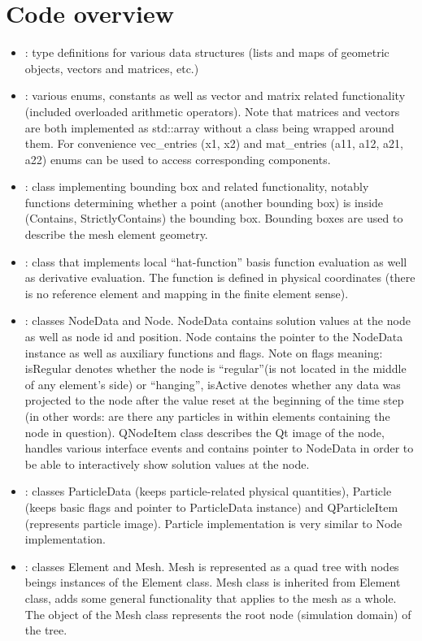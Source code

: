 \section{Code overview}
\begin{itemize}
  \item {} : type definitions for various data structures (lists and maps of geometric objects, vectors and matrices, etc.)
  \item {} : various enums, constants as well as vector and matrix related functionality (included overloaded arithmetic operators).
	Note that matrices and vectors are both implemented as std::array without a class being wrapped around them. For convenience vec\_entries (x1, x2) and 
	mat\_entries (a11, a12, a21, a22) enums can be used to access corresponding components.
  \item {} : class implementing bounding box and related functionality, notably functions determining whether a point (another bounding box)
	is inside (Contains, StrictlyContains) the bounding box. Bounding boxes are used to describe the mesh element geometry.
  \item {} : class that implements local ``hat-function'' basis function evaluation as well as derivative evaluation. The function is defined in
	physical coordinates (there is no reference element and mapping in the finite element sense).
  \item {} : classes NodeData and Node. NodeData contains solution values at the node as well as node id and position. Node contains
	the pointer to the NodeData instance as well as auxiliary functions and flags. Note on flags meaning: isRegular denotes whether the node is 
	``regular''(is not located in the middle of any element's side) or ``hanging'', isActive denotes whether any data was projected to the node after the 
	value reset at the beginning of the time step (in other words: are there any particles in within elements containing the node in question).
	QNodeItem class describes the Qt image of the node, handles various interface events and contains pointer to NodeData in order to be able to interactively
	show solution values at the node.
  \item {} : classes ParticleData (keeps particle-related physical quantities), Particle (keeps basic flags and pointer to ParticleData instance) and 
	QParticleItem (represents particle image). Particle implementation is very similar to Node implementation.
  \item {} : classes Element and Mesh. Mesh is represented as a quad tree with nodes beings instances of the Element class. 
	Mesh class is inherited from Element class, adds some general functionality that applies to the mesh as a whole. The object of the Mesh class represents the root 
	node (simulation domain) of the tree.
\end{itemize}
